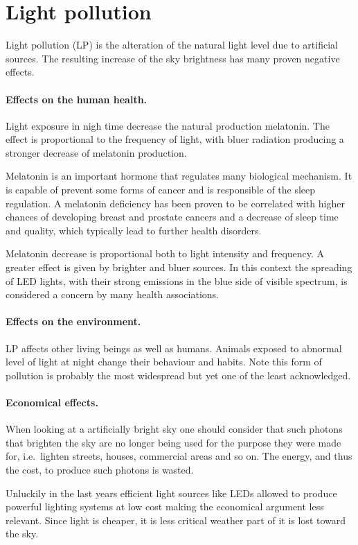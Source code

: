 \documentclass[a4paper, titlepage, 10pt]{book}
\begin{document}
\section{Light pollution}
Light pollution (LP) is the alteration of the natural light level due to artificial sources. The resulting increase of the sky brightness has many proven negative effects.

\paragraph{Effects on the human health.} Light exposure in nigh time decrease the natural production melatonin. The effect is proportional to the frequency of light, with bluer radiation producing a stronger decrease of melatonin production.
	
Melatonin is an important hormone that regulates many biological mechanism. It is capable of prevent some forms of cancer and is responsible of the sleep regulation. A melatonin deficiency has been proven to be correlated with higher chances of developing breast and prostate cancers and a decrease of sleep time and quality, which typically lead to further health disorders.
	
Melatonin decrease is proportional both to light intensity and frequency. A greater effect is given by brighter and bluer sources. In this context the spreading of LED lights, with their strong emissions in the blue side of visible spectrum, is considered a concern by many health associations.

\paragraph{Effects on the environment.} LP affects other living beings as well as humans. Animals exposed to abnormal level of light at night change their behaviour and habits. Note this form of pollution is probably the most widespread but yet one of the least acknowledged.

\paragraph{Economical effects.} When looking at a artificially bright sky one should consider that such photons that brighten the sky are no longer being used for the purpose they were made for, i.e.\ lighten streets, houses, commercial areas and so on. The energy, and thus the cost, to produce such photons is wasted. 

Unluckily in the last years efficient light sources like LEDs allowed to produce powerful lighting systems at low cost making the economical argument less relevant. Since light is cheaper, it is less critical weather part of it is lost toward the sky.
\end{document}
